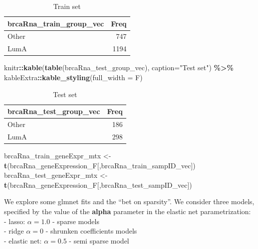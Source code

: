 \documentclass[
]{book}
\newenvironment{Shaded}{\begin{snugshade}}{\end{snugshade}}
\newcommand{\DataTypeTok}[1]{\textcolor[rgb]{0.13,0.29,0.53}{#1}}
\newcommand{\KeywordTok}[1]{\textcolor[rgb]{0.13,0.29,0.53}{\textbf{#1}}}
\newcommand{\NormalTok}[1]{#1}
\newcommand{\OperatorTok}[1]{\textcolor[rgb]{0.81,0.36,0.00}{\textbf{#1}}}
\newcommand{\StringTok}[1]{\textcolor[rgb]{0.31,0.60,0.02}{#1}}
\begin{document}
\begin{table}

\caption{\label{tab:brcaRna-glmnetFit-getTrainVal}Train set}
\centering
\begin{tabular}[t]{l|r}
\hline
brcaRna\_train\_group\_vec & Freq\\
\hline
Other & 747\\
\hline
LumA & 1194\\
\hline
\end{tabular}
\end{table}

\begin{Shaded}
\begin{Highlighting}[]
\NormalTok{knitr}\OperatorTok{::}\KeywordTok{kable}\NormalTok{(}\KeywordTok{table}\NormalTok{(brcaRna\_test\_group\_vec),}
  \DataTypeTok{caption=}\StringTok{"Test set"}\NormalTok{) }\OperatorTok{\%>\%}
\StringTok{   }\NormalTok{kableExtra}\OperatorTok{::}\KeywordTok{kable\_styling}\NormalTok{(}\DataTypeTok{full\_width =}\NormalTok{ F)}
\end{Highlighting}
\end{Shaded}

\begin{table}

\caption{\label{tab:brcaRna-glmnetFit-getTrainVal}Test set}
\centering
\begin{tabular}[t]{l|r}
\hline
brcaRna\_test\_group\_vec & Freq\\
\hline
Other & 186\\
\hline
LumA & 298\\
\hline
\end{tabular}
\end{table}

\begin{Shaded}
\begin{Highlighting}[]
\NormalTok{brcaRna\_train\_geneExpr\_mtx <{-}}\StringTok{ }\KeywordTok{t}\NormalTok{(brcaRna\_geneExpression\_F[,brcaRna\_train\_sampID\_vec])}
\NormalTok{brcaRna\_test\_geneExpr\_mtx <{-}}\StringTok{ }\KeywordTok{t}\NormalTok{(brcaRna\_geneExpression\_F[,brcaRna\_test\_sampID\_vec])}
\end{Highlighting}
\end{Shaded}

We explore some glmnet fits and the ``bet on sparsity''.
We consider three models, specified by the value of the
\textbf{alpha} parameter in the elastic net parametrization:\\
- lasso: \(\alpha = 1.0\) - sparse models\\
- ridge \(\alpha = 0\) - shrunken coefficients models\\
- elastic net: \(\alpha = 0.5\) - semi sparse model\\
\end{document}
